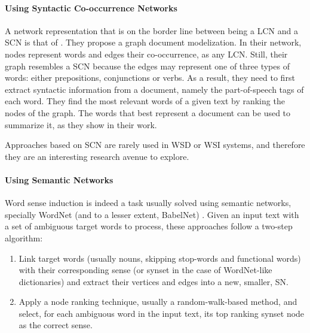 \paragraph{Using Syntactic Co-occurrence Networks}

A network representation that is on the border line between being a LCN and a SCN is that of \cite{2013.Bronselaer.TextAnalysisWithGraphs}. They  propose a graph document modelization. In their network, nodes represent words and edges their co-occurrence, as any LCN. Still, their graph resembles a SCN because the edges may represent one of three types of words: either prepositions, conjunctions or verbs. As a result,  they need to first extract syntactic information from a document, namely the part-of-speech tags of each word. They find the most relevant words of a given text by ranking the nodes of the graph. The words that best represent a document can be used to summarize it, as they show in their work.

Approaches based on SCN are rarely used in WSD or WSI systems, and therefore they are an interesting research avenue to explore.




\paragraph{Using Semantic Networks}

Word sense induction is indeed a task usually solved using semantic networks, specially WordNet (and to a lesser extent, BabelNet) \cite{2004.Mihalcea.SemanticNetworkPageRank,2007.Sinha.Mihalcea.Unsupervised,2007.Tsatsaronis.WSDwithSpreading,2007.Navigli.GraphConnectivity,2008.Agirre.Multilingual,2008.Klapaftis.WSIUsingCollocations,2009.Agirre.PersonalizedPageRankWSD,2010.Klapaftis.WSD.WSD.HierarchicalGraphs,2010.Siberer.GraphCooccurrenceWSD,2014.Moro.Navigli.EntityLinking_WSD}. Given an input text with a set of ambiguous target words to process, these approaches follow a two-step algorithm:
\begin{enumerate}
\item Link target words (usually nouns, skipping stop-words and functional words) with their corresponding  sense (or synset in the case of WordNet-like dictionaries) and extract their vertices and edges into a new, smaller, SN. 
\item Apply a node ranking technique, usually a random-walk-based method, and select, for each ambiguous word in the input text,  its top ranking synset node as the correct sense.
\end{enumerate}

